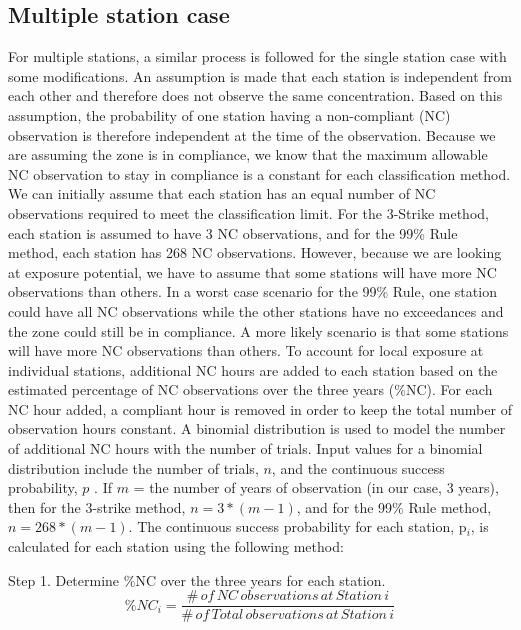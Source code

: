 \subsection{Multiple station case}
For multiple stations, a similar process is followed for the single station case with some modifications. An assumption is made that each station is independent from each other and therefore does not observe the same concentration. Based on this assumption, the probability of one station having a non-compliant (NC) observation is therefore independent at the time of the observation. Because we are assuming the zone is in compliance, we know that the maximum allowable NC observation to stay in compliance is a constant for each classification method. We can initially assume that each station has an equal number of NC observations required to meet the classification limit. For the 3-Strike method, each station is assumed to have 3 NC observations, and for the 99\% Rule method, each station has 268 NC observations. However, because we are looking at exposure potential, we have to assume that some stations will have more NC observations than others. In a worst case scenario for the 99\% Rule, one station could have all NC observations while the other stations have no exceedances and the zone could still be in compliance. A more likely scenario is that some stations will have more NC observations than others. To account for local exposure at individual stations, additional NC hours are added to each station based on the estimated percentage of NC observations over the three years (\%NC). For each NC hour added, a compliant hour is removed in order to keep the total number of observation hours constant. A binomial distribution is used to model the number of additional NC hours with the number of trials. Input values for a binomial distribution include the number of trials, $n$, and the continuous success probability, $p$ \citep{Palisades2016}.  If $m$ = the number of years of observation (in our case, 3 years), then for the 3-strike method, $n = 3*(m{-}1)$, and for the 99\% Rule method, $n = 268*(m{-}1)$. The continuous success probability for each station, p$_{i}$, is calculated for each station using the following method:

Step 1. Determine \%NC over the three years for each station. 
%
\begin{equation}
\label{eq11:step1}
\%NC_{i}=\frac{\#\, of\, NC\, observations\, at\, Station\, i}{\#\, of\, Total\, observations\, at\, Station\, i}
\end{equation}

